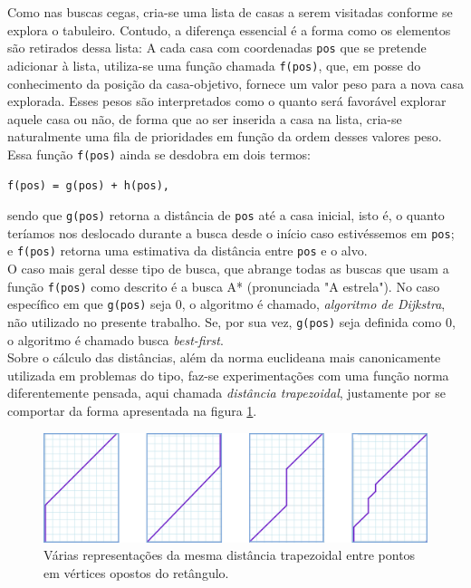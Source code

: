 \documentclass[12pt]{article}
\begin{document}
Como nas buscas cegas, cria-se uma lista de casas a serem visitadas conforme se explora o tabuleiro. Contudo, a diferença essencial é a forma como os elementos são retirados dessa lista: A cada casa com coordenadas \verb|pos| que se pretende adicionar à lista, utiliza-se uma função chamada \verb|f(pos)|, que, em posse do conhecimento da posição da casa-objetivo, fornece um valor peso para a nova casa explorada. Esses pesos são interpretados como o quanto será favorável explorar aquele casa ou não, de forma que ao ser inserida a casa na lista, cria-se naturalmente uma fila de prioridades em função da ordem desses valores peso.\\

Essa função \verb|f(pos)| ainda se desdobra em dois termos:

\begin{verbatim}
f(pos) = g(pos) + h(pos),
\end{verbatim}

sendo que \verb|g(pos)| retorna a distância de \verb|pos| até a casa inicial, isto é, o quanto teríamos nos deslocado durante a busca desde o início caso estivéssemos em \verb|pos|; e \verb|f(pos)| retorna uma estimativa da distância entre \verb|pos| e o alvo.\\

O caso mais geral desse tipo de busca, que abrange todas as buscas que usam a função \verb|f(pos)| como descrito é a busca A* (pronunciada "A estrela"). No caso específico em que \verb|g(pos)| seja 0, o algoritmo é chamado, \emph{algoritmo de Dijkstra}, não utilizado no presente trabalho. Se, por sua vez, \verb|g(pos)| seja definida como 0, o algoritmo é chamado busca \emph{best-first}.\\

Sobre o cálculo das distâncias, além da norma euclideana mais canonicamente utilizada em problemas do tipo, faz-se experimentações com uma função norma diferentemente pensada, aqui chamada \emph{distância trapezoidal}, justamente por se comportar da forma apresentada na figura \ref{fig:trapezoidal}.

\begin{figure}[h!]
	\centering
	\label{fig:trapezoidal}
	\includegraphics[width=.9\textwidth]{trapezoidal}
	\caption{Várias representações da mesma distância trapezoidal entre pontos em vértices opostos do retângulo.}
\end{figure}
\end{document}
